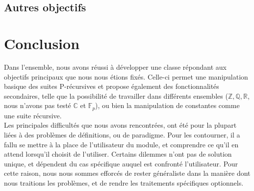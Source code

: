 \documentclass[12pt]{article}
\begin{document}
    \subsection{Autres objectifs}

\setcounter{secnumdepth}{0}
\section{Conclusion}
        Dans l'ensemble, nous avons réussi à développer une classe répondant aux objectifs
        principaux que nous nous étions fixés.
        Celle-ci permet une manipulation basique des suites P-récursives 
        et propose également des fonctionnalités secondaires, telle que la possibilité de travailler
        dans différents ensembles ($\mathbb{Z,Q,R}$, nous n'avons pas testé $\mathbb{C}$ et 
        $\mathbb F_p$), ou bien la manipulation de constantes comme une suite récursive.\\
        Les principales difficultés que nous avons rencontrées, ont été pour la plupart liées
        à des problèmes de définitions, ou de paradigme. Pour les contourner, il a fallu
        se mettre à la place de l'utilisateur du module, et comprendre ce qu'il en attend lorsqu'il choisit
        de l'utiliser. Certains dilemmes n'ont pas de solution unique, et dépendent du cas spécifique
        auquel est confronté l'utilisateur. Pour cette raison, nous nous sommes efforcés de rester 
        généraliste dans la manière dont nous traitions les problèmes, et de rendre les traitements
        spécifiques optionnels.
        
       

\end{document}

